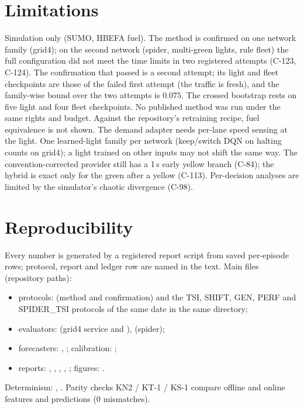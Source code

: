 \documentclass[11pt]{article}
\begin{document}
\section{Limitations}
Simulation only (SUMO, HBEFA fuel). The method is confirmed on one network family (grid4); on the second network (spider, multi-green
lights, rule fleet) the full configuration did not meet the time limits in two registered attempts (C-123, C-124). The confirmation that
passed is a second attempt; its light and fleet checkpoints are those of the failed first attempt (the traffic is fresh), and the
family-wise bound over the two attempts is $0.075$. The crossed bootstrap rests on five light and four fleet checkpoints. No published
method was run under the same rights and budget. Against the repository's retraining recipe, fuel equivalence is not shown. The demand
adapter needs per-lane speed sensing at the light. One learned-light family per network (keep/switch DQN on halting counts on grid4); a
light trained on other inputs may not shift the same way. The convention-corrected provider still has a 1\,s early yellow branch (C-84);
the hybrid is exact only for the green after a yellow (C-113). Per-decision analyses are limited by the simulator's chaotic divergence
(C-98).

\section{Reproducibility}
Every number is generated by a registered report script from saved per-episode rows; protocol, report and ledger row are named in the
text. Main files (repository paths):
\begin{itemize}\setlength\itemsep{0pt}
\item protocols:  (method and confirmation) and the TSI, SHIFT, GEN, PERF and
SPIDER\_TSI protocols of the same date in the same directory;
\item evaluators:  (grid4 service and ),  (spider);
\item forecasters: , ; calibration: ;
\item reports: , , , ,
; figures: .
\end{itemize}
Determinism: , . Parity checks KN2 / KT-1 / KS-1 compare offline and online features and
predictions (0 mismatches).
\end{document}
